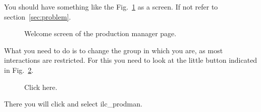 \documentclass[a4paper,12pt]{article}
\begin{document}
You should have something like the Fig.~\ref{fig:welcome} as a screen. If not refer to
section~\ref{sec:problem}.
\begin{figure}[h]
\begin{center}
\end{center}
\caption{Welcome screen of the production manager page.}\label{fig:welcome}
\end{figure}

What you need to do is to change the group in which you are, as most
interactions are restricted. For this you need to look at the little button
indicated in Fig.~\ref{fig:welcome2}. 
\begin{figure}[h]
\begin{center}
\end{center}
\caption{Click here.}\label{fig:welcome2}
\end{figure}
There you will click and select {\color{red} ilc\_prodman}.
\end{document}
